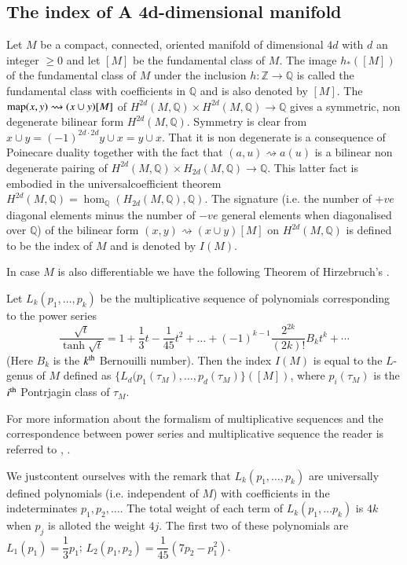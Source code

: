 \setcounter{subsection}{5}
 \subsection{The index of A 4d-dimensional
   manifold}\label{chap1:subsec1.6}%
 
 Let $M$ be a compact, connected, oriented manifold of dimensional $4d$
 with $d$ an integer $\geq 0$ and let $[M]$ be the fundamental class of
 $M$. The image $h_*([M])$ of the fundamental class of $M$ under the
 inclusion $h:\mathbb{Z} \to \mathbb{Q}$ is called the fundamental
 class with coefficients in $\mathbb{Q}$ and is also denoted by
 $[M]$. The $\operatorname{map} (x, y) \rightsquigarrow (x \cup y)[M]$ of $H^{2d} (M,
 \mathbb{Q}) \times H^{2d} (M, \mathbb{Q}) \to \mathbb{Q}$ gives a
 symmetric, non degenerate bilinear form $H^{2d} (M,
 \mathbb{Q})$. Symmetry is clear from $x \cup y=(-1)^{2d \cdot 2d}  y \cup x =
 y \cup x$. That it is non degenerate is a consequence of Poinecare
 duality together with the fact that $(a, u) \rightsquigarrow a(u)$ is a
 bilinear non degenerate pairing of $H^{2d} (M, \mathbb{Q}) \times
 H_{2d} (M, \mathbb{Q}) \to \mathbb{Q}$. This latter fact is
 embodied in the  universal\pageoriginale coefficient theorem $H^{2d} (M,
 \mathbb{Q}) = \hom_{\mathbb{Q}} (H_{2d} (M, \mathbb{Q}),
 \mathbb{Q})$. The signature (i.e. the number of $+ve$ diagonal
 elements minus the number of $-ve$ general elements when diagonalised
 over $\mathbb{Q}$) of the bilinear form $(x, y) \rightsquigarrow (x
 \cup y) [M]$ on $H^{2d} (M, \mathbb{Q})$ is defined to be the index
 of $M$ and is denoted by $I(M)$. 
 
 In case $M$ is also differentiable we have the following Theorem of
 Hirzebruch's \cite{c1:key1}. 
 
\setcounter{theorem}{6}
 \begin{theorem}%
Let $L_k (p_1, \ldots,p_k)$ be the multiplicative sequence of
polynomials corresponding to the power series 
$$
\frac{\sqrt{t}}{\tanh \sqrt{t}} = 1 +\frac{1}{3} t- \frac{1}{45} t^2 +
\dots + (-1)^{k-1} \frac{2^{2k}}{(2k)!} B_k t^k + \cdots 
$$
(Here $B_k$ is the $k^{\rm th}$ Bernouilli number). Then the index $I(M)$
is equal to the $L$-genus of $M$ defined as $\bigg\{L_d(p_1 (\tau_M),
\ldots, p_d (\tau_M) \bigg\} ([M])$, where $p_i (\tau_M)$ is the
$i^{\rm th}$ Pontrjagin class of $\tau_M$.  
  
  For more information about the formalism of multiplicative sequen\-ces
  and the correspondence between power series and multiplicative
  sequence the reader is referred to \cite{c1:key1}, \cite{c1:key5}. 
  
  We just\pageoriginale content ourselves with the remark that $L_k (p_1,
  \ldots,p_k) $ are universally defined polynomials (i.e. independent
  of $M$) with coefficients in the indeterminates $p_1, p_2, \ldots
  $. The total weight of each term of $L_k(p_1,\ldots p_k)$ is $4k$ when
  $p_j$ is alloted the weight $4j$. The  first two of these
  polynomials are $L_1(p_1) = \dfrac{1}{3}p_1$; $L_2(p_1, p_2) =
  \dfrac{1}{45}(7 p_2-p^2_1)$.  
 \end{theorem}

